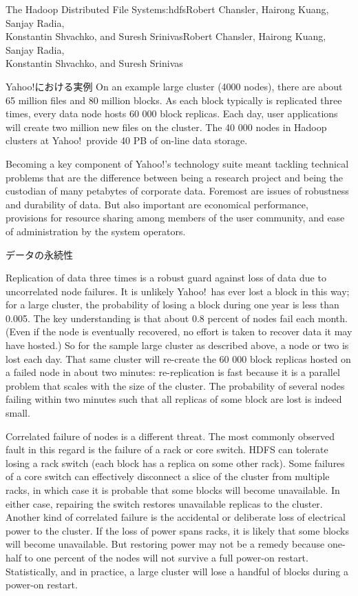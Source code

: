\begin{aosachaptertoc}{The Hadoop Distributed File System}{s:hdfs}{Robert Chansler, Hairong Kuang, Sanjay Radia, \\ Konstantin Shvachko, and Suresh Srinivas}{Robert Chansler, Hairong Kuang, Sanjay Radia, \\ \hspace*{0.9cm} Konstantin Shvachko, and Suresh Srinivas}
\begin{aosasect1}{Yahoo!における実例}
On an example large cluster (4000 nodes), there are about 65 million
files and 80 million blocks. As each block typically is replicated
three times, every data node hosts 60 000 block replicas. Each day,
user applications will create two million new files on the
cluster. The 40 000 nodes in Hadoop clusters at Yahoo!\ provide 40 PB
of on-line data storage.

Becoming a key component of Yahoo!'s technology suite meant tackling
technical problems that are the difference between being a research
project and being the custodian of many petabytes of corporate data.
Foremost are issues of robustness and durability of data. But also
important are economical performance, provisions for resource sharing
among members of the user community, and ease of administration by the
system operators.

\begin{aosasect2}{データの永続性}

Replication of data three times is a robust guard against loss of data
due to uncorrelated node failures. It is unlikely Yahoo!\ has ever lost
a block in this way; for a large cluster, the probability of losing a
block during one year is less than 0.005. The key understanding is
that about 0.8 percent of nodes fail each month. (Even if the node is
eventually recovered, no effort is taken to recover data it may have
hosted.) So for the sample large cluster as described above, a node or
two is lost each day. That same cluster will re-create the 60 000
block replicas hosted on a failed node in about two
minutes: re-replication is fast because it is a parallel problem that
scales with the size of the cluster. The probability of several nodes
failing within two minutes such that all replicas of some block are
lost is indeed small.

Correlated failure of nodes is a different threat. The most commonly
observed fault in this regard is the failure of a rack or core switch.
HDFS can tolerate losing a rack switch (each block has a replica on
some other rack). Some failures of a core switch can effectively
disconnect a slice of the cluster from multiple racks, in which case
it is probable that some blocks will become unavailable. In either
case, repairing the switch restores unavailable replicas to the
cluster. Another kind of correlated failure is the accidental or
deliberate loss of electrical power to the cluster. If the loss of
power spans racks, it is likely that some blocks will become
unavailable. But restoring power may not be a remedy because one-half
to one percent of the nodes will not survive a full power-on restart.
Statistically, and in practice, a large cluster will lose a handful of
blocks during a power-on restart.


\end{aosasect2}
\end{aosasect1}
\end{aosachaptertoc}
